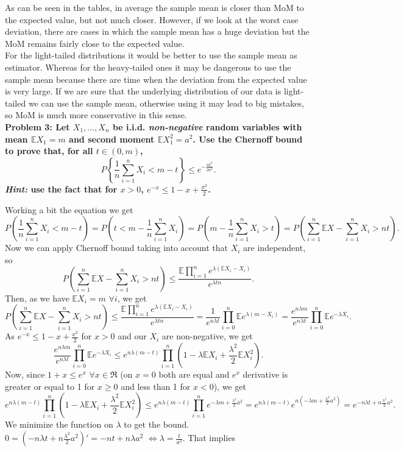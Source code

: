 \documentclass[11pt, english]{article}
\begin{document}
As can be seen in the tables, in average the sample mean is closer than MoM to the expected value, but not much closer. However, if we look at the worst case deviation, there are cases in which the sample mean has a huge deviation but the MoM remains fairly close to the expected value. \\
For the light-tailed distributions it would be better to use the sample mean as estimator. Whereas for the heavy-tailed ones it may be dangerous to use the sample mean because there are time when the deviation from the expected value is very large. If we are sure that the underlying distribution of our data is light-tailed we can use the sample mean, otherwise using it may lead to big mistakes, so MoM is much more conservative in this sense. \\ 



\textbf{Problem 3: Let $X_1,\dots,X_n$ be i.i.d. \textit{non-negative} random variables with mean $\mathbb{E}X_1=m$ and second moment $\mathbb{E}X_1^2=a^2$. Use the Chernoff bound to prove that, for all $t\in(0,m)$,}
$$P\left\{\frac{1}{n}\sum_{i=1}^n X_i<m-t\right\}\leq e^{-\frac{n t^2}{2 a^2}}.$$
\textbf{\textit{Hint:} use the fact that for $x>0$, $e^{-x}\leq 1-x+\frac{x^2}{2}$.\\}

Working a bit the equation we get $$P\left(\frac{1}{n}\sum_{i=1}^nX_i<m-t\right)=P\left(t<m-\frac{1}{n}\sum_{i=1}^nX_i\right)=P\left(m-\frac{1}{n}\sum_{i=1}^nX_i>t\right)=P\left(\sum_{i=1}^n\mathbb{E}X-\sum_{i=1}^nX_i>nt\right).$$
Now we can apply Chernoff bound taking into account that $X_i$ are independent, so
$$P\left(\sum_{i=1}^n\mathbb{E}X-\sum_{i=1}^nX_i>nt\right)\leq \frac{\mathbb{E}\prod\limits_{i=1}^ne^{\lambda(\mathbb{E}X_i-X_i)}}{e^{\lambda t n}}.$$
Then, as we have $\mathbb{E}X_i=m$ $\forall i$, we get
$$P\left(\sum_{i=1}^n\mathbb{E}X-\sum_{i=1}^nX_i>nt\right)\leq \frac{\mathbb{E}\prod\limits_{i=1}^ne^{\lambda(\mathbb{E}X_i-X_i)}}{e^{\lambda t n}}=\frac{1}{e^{n\lambda t}}\prod\limits_{i=0}^n\mathbb{E}e^{\lambda(m-X_i)}=\frac{e^{n\lambda m}}{e^{n\lambda t}}\prod\limits_{i=0}^n\mathbb{E}e^{-\lambda X_i}.$$
As $e^{-x}\leq 1-x+\frac{x^2}{2}$ for $x>0$ and our $X_i$ are non-negative, we get
$$\frac{e^{n\lambda m}}{e^{n\lambda t}}\prod\limits_{i=0}^n\mathbb{E}e^{-\lambda X_i}\leq e^{n\lambda (m-t)}\prod\limits_{i=1}^n(1-\lambda \mathbb{E}X_i+\frac{\lambda^2}{2}\mathbb{E}X_i^2).$$
Now, since $1+x\leq e^x$ $\forall x\in \Re$ (on $x=0$ both are equal and $e^x$ derivative is greater or equal to 1 for $x\geq0$ and less than 1 for $x<0$), we get
$$e^{n\lambda (m-t)}\prod\limits_{i=1}^n(1-\lambda \mathbb{E}X_i+\frac{\lambda^2}{2}\mathbb{E}X_i^2)\leq e^{n\lambda(m-t)}\prod\limits_{i=1}^n e^{-\lambda m+\frac{\lambda^2}{2}a^2}=e^{n\lambda(m-t)}e^{n(-\lambda m+\frac{\lambda^2}{2}a^2)}=e^{-n\lambda t+n\frac{\lambda^2}{2}a^2}.$$
We minimize the function on $\lambda$ to get the bound. $0=(-n\lambda t+n\frac{\lambda^2}{2}a^2)'=-nt+n\lambda a^2$ $\Leftrightarrow \lambda=\frac{t}{a^2}$. That implies 
 
\end{document}
